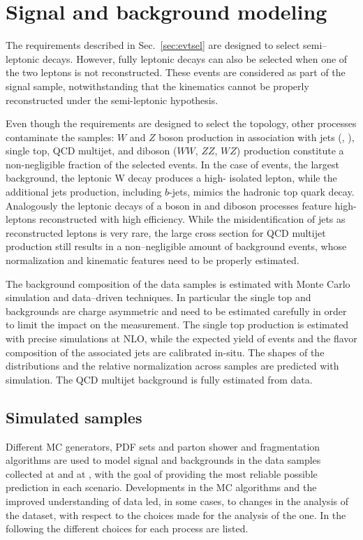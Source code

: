 \section{Signal and background modeling}
\label{sec:bckgmodel}

The requirements described in Sec.~\ref{sec:evtsel} are designed to
select semi--leptonic \ttbar{} decays. However, fully
leptonic decays can also be selected when one of the two leptons is not
reconstructed. These events are considered as part of the signal
sample, notwithstanding that the \ttbar{} kinematics cannot be
properly reconstructed under the semi-leptonic hypothesis.

Even though the requirements are designed to select the \ttbar{}
topology, other processes contaminate the samples: $W$ and $Z$ boson
production in association with jets (\wjets{}, \zjets{}), single top,
QCD multijet, and diboson ($WW$, $ZZ$, $WZ$) production constitute a
non-negligible fraction of the selected events.
In the case of \wjets{} events, the largest background, the leptonic W
decay produces a high-\pt{} isolated lepton, while the additional jets
production, including $b$-jets, mimics the hadronic top quark decay.
Analogously the leptonic decays of a boson in \zjets{} and diboson
processes feature high-\pt{} leptons reconstructed with high
efficiency.
While the misidentification of jets as reconstructed leptons is very
rare, the large cross section for QCD multijet production still results in a
non--negligible amount of background events, whose normalization and
kinematic features need to be properly estimated.


The background composition of the data samples is estimated with Monte
Carlo simulation and data--driven techniques. In particular the single top
and \wjets{} backgrounds are charge asymmetric and need to be estimated
carefully in order to limit the impact on the measurement. The single top
production is estimated with precise simulations at NLO, while the
expected yield of \wjets{} events and the flavor composition of the
associated jets are calibrated in-situ. The shapes of the
distributions and the relative normalization across samples are
predicted with simulation.
The QCD multijet background is fully estimated from data.

\subsection{Simulated samples}
\label{sec:mcsamples}

Different MC generators, PDF sets and parton shower and fragmentation
algorithms are used to model signal and backgrounds in the data
samples collected at \seventev{} and at \eighttev{}, with the goal of
providing the most reliable possible prediction in each scenario.
Developments in the MC algorithms and the improved understanding of
data led, in some cases, to changes in the analysis of the \eighttev{}
dataset, with respect to the choices made for the analysis of the
\seventev{} one. 
In the following the different choices for each process are listed.

